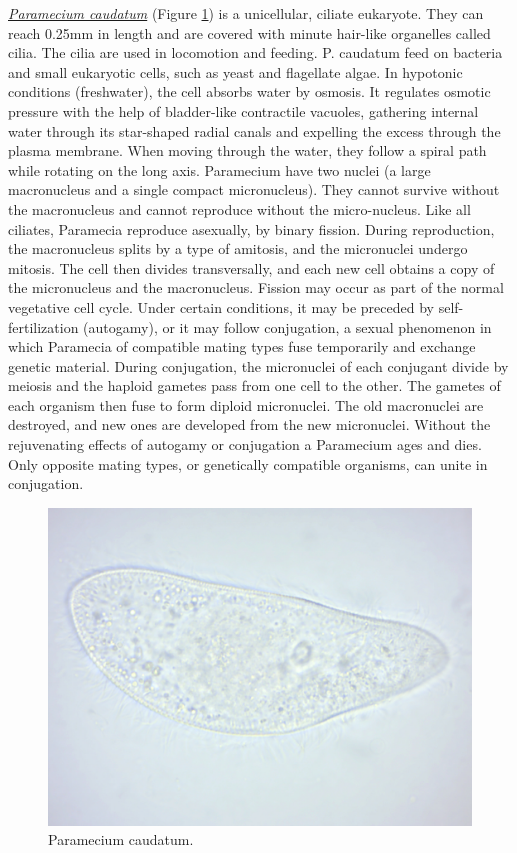\href{https://en.wikipedia.org/wiki/Paramecium_caudatum}{\emph{Paramecium
caudatum}} (Figure \ref{fig:paramecium}) is a unicellular, ciliate
eukaryote. They can reach 0.25mm in length and are covered with minute
hair-like organelles called cilia. The cilia are used in locomotion and
feeding. P. caudatum feed on bacteria and small eukaryotic cells, such
as yeast and flagellate algae. In hypotonic conditions (freshwater), the
cell absorbs water by osmosis. It regulates osmotic pressure with the
help of bladder-like contractile vacuoles, gathering internal water
through its star-shaped radial canals and expelling the excess through
the plasma membrane. When moving through the water, they follow a spiral
path while rotating on the long axis. Paramecium have two nuclei (a
large macronucleus and a single compact micronucleus). They cannot
survive without the macronucleus and cannot reproduce without the
micro-nucleus. Like all ciliates, Paramecia reproduce asexually, by
binary fission. During reproduction, the macronucleus splits by a type
of amitosis, and the micronuclei undergo mitosis. The cell then divides
transversally, and each new cell obtains a copy of the micronucleus and
the macronucleus. Fission may occur as part of the normal vegetative
cell cycle. Under certain conditions, it may be preceded by
self-fertilization (autogamy), or it may follow conjugation, a sexual
phenomenon in which Paramecia of compatible mating types fuse
temporarily and exchange genetic material. During conjugation, the
micronuclei of each conjugant divide by meiosis and the haploid gametes
pass from one cell to the other. The gametes of each organism then fuse
to form diploid micronuclei. The old macronuclei are destroyed, and new
ones are developed from the new micronuclei. Without the rejuvenating
effects of autogamy or conjugation a Paramecium ages and dies. Only
opposite mating types, or genetically compatible organisms, can unite in
conjugation.

\begin{figure}

{\centering \includegraphics[width=0.7\linewidth]{./figures/protists/Paramecium_caudatum}

}

\caption{Paramecium caudatum.}\label{fig:paramecium}
\end{figure}

